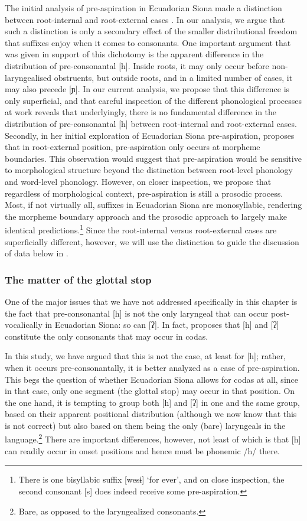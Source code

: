 \documentclass[output=paper]{langscibook}
\begin{document}
The initial analysis of pre-aspiration in Ecuadorian Siona made a distinction between root-internal and root-external cases \citep{Bruil:2014}. In our analysis, we argue that such a distinction is only a secondary effect of the smaller distributional freedom that suffixes enjoy when it comes to consonants. One important argument that was given in support of this dichotomy is the apparent difference in the distribution of pre-consonantal [h]. Inside roots, it may only occur before non-laryngealised obstruents, but outside roots, and in a limited number of cases, it may also precede [ɲ]. In our current analysis, we propose that this difference is only superficial, and that careful inspection of the different phonological processes at work reveals that underlyingly, there is no fundamental difference in the distribution of pre-consonantal [h] between root-internal and root-external cases. Secondly, in her initial exploration of Ecuadorian Siona pre-aspiration, \citet{Bruil:2014} proposes that in root-external position, pre-aspiration only occurs at morpheme boundaries. This observation would suggest that pre-aspiration would be sensitive to morphological structure beyond the distinction between root-level phonology and word-level phonology. However, on closer inspection, we propose that regardless of morphological context, pre-aspiration is still a prosodic process. Most, if not virtually all, suffixes in Ecuadorian Siona are monosyllabic, rendering the morpheme boundary approach and the prosodic approach to largely make identical predictions.\footnote{There is one bisyllabic suffix [wesɨ] `for ever', and on close inspection, the second consonant [s] does indeed receive some pre-aspiration.} Since the root-internal versus root-external cases are superficially different, however, we will use the distinction to guide the discussion of data below in .


\subsubsection{The matter of the glottal stop}\label{sec-glotstop}
One of the major issues that we have not addressed specifically in this chapter is the fact that pre-consonantal [h] is not the only laryngeal that can occur post-vocalically in Ecuadorian Siona: so can [ʔ]. In fact, \citet{Bruil:2014} proposes that  [h] and [ʔ] constitute the only consonants that may occur in codas.


In this study, we have argued that this is not the case, at least for [h]; rather, when it occurs pre-consonantally, it is better analyzed as a case of pre-aspiration. This begs the question of whether Ecuadorian Siona allows for codas at all, since in that case, only one segment (the glottal stop) may occur in that position. On the one hand, it is tempting to group both [h] and [ʔ] in one and the same group, based on their apparent positional distribution (although we now know that this is not correct) but also based on them being the only (bare) laryngeals in the language.\footnote{Bare, as opposed to the laryngealized consonants.} There are important differences, however, not least of which is that [h] can readily occur in onset positions and hence must be phonemic /h/ there.
\end{document}
